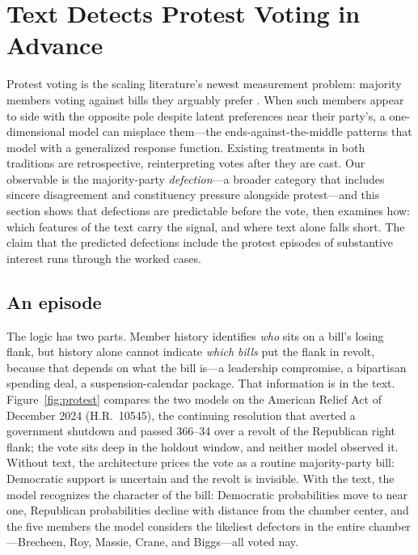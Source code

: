 \documentclass[12pt]{article}
\begin{document}
\section{Text Detects Protest Voting in Advance}
\label{sec:protest}

Protest voting is the scaling literature's newest measurement
problem: majority members voting against bills they arguably prefer
\citep{fowler2026protest}. When such members appear to side with the
opposite pole despite latent preferences near their party's, a
one-dimensional model can misplace them---the ends-against-the-middle
patterns that \citet{duckmayr2023ends} model with a generalized
response function. Existing treatments in both traditions are
retrospective, reinterpreting votes after they are cast. Our
observable is the majority-party \emph{defection}---a broader
category that includes sincere disagreement and constituency pressure
alongside protest---and this section shows that defections are
predictable before the vote, then examines how: which features of the
text carry the signal, and where text alone falls short. The claim
that the predicted defections include the protest episodes of
substantive interest runs through the worked cases.

\subsection{An episode}

The logic has two parts. Member history identifies \emph{who} sits on
a bill's losing flank, but history alone cannot indicate \emph{which
bills} put the flank in revolt, because that depends on what the bill
is---a leadership compromise, a bipartisan spending deal, a
suspension-calendar package. That information is in the text.
Figure~\ref{fig:protest} compares the two models on the American
Relief Act of December 2024 (H.R.~10545), the continuing resolution
that averted a government shutdown and passed 366--34 over a revolt
of the Republican right flank; the vote sits deep in the holdout
window, and neither model observed it. Without text, the architecture
prices the vote as a routine majority-party bill: Democratic support
is uncertain and the revolt is invisible. With the text, the model
recognizes the character of the bill: Democratic probabilities move
to near one, Republican probabilities decline with distance from the
chamber center, and the five members the model considers the
likeliest defectors in the entire chamber---Brecheen, Roy, Massie,
Crane, and Biggs---all voted nay.
\end{document}
